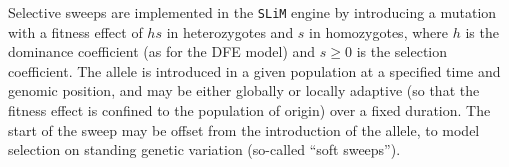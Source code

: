 \documentclass[hidelinks]{article}
\newcommand{\slim}{\texttt{SLiM}\xspace}
\begin{document}






    Selective sweeps are implemented in the \slim engine by introducing a
    mutation with a fitness effect of $h s$ in heterozygotes and $s$ in homozygotes,
    where $h$ is the dominance coefficient (as for the DFE model) and $s \geq 0$ is the selection
    coefficient. The allele is introduced in a given population at a specified
    time and genomic position, and may be either globally or locally adaptive
    (so that the fitness effect is confined to the population of origin) over a
    fixed duration. The start of the sweep may be offset from the introduction
    of the allele, to model selection on standing genetic variation (so-called
    ``soft sweeps'').
\end{document}
